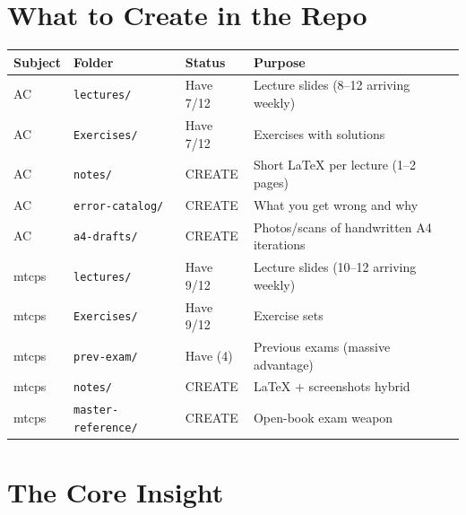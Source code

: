 \documentclass[11pt,a4paper]{article}
\begin{document}
\section{What to Create in the Repo}

\begin{center}
\renewcommand{\arraystretch}{1.3}
\begin{tabular}{llll}
\toprule
\textbf{Subject} & \textbf{Folder} & \textbf{Status} & \textbf{Purpose} \\
\midrule
AC & \texttt{lectures/} & Have 7/12 & Lecture slides (8--12 arriving weekly) \\
AC & \texttt{Exercises/} & Have 7/12 & Exercises with solutions \\
AC & \texttt{notes/} & \textcolor{warnred}{CREATE} & Short LaTeX per lecture (1--2 pages) \\
AC & \texttt{error-catalog/} & \textcolor{warnred}{CREATE} & What you get wrong and why \\
AC & \texttt{a4-drafts/} & \textcolor{warnred}{CREATE} & Photos/scans of handwritten A4 iterations \\
\midrule
mtcps & \texttt{lectures/} & Have 9/12 & Lecture slides (10--12 arriving weekly) \\
mtcps & \texttt{Exercises/} & Have 9/12 & Exercise sets \\
mtcps & \texttt{prev-exam/} & Have (4) & Previous exams (massive advantage) \\
mtcps & \texttt{notes/} & \textcolor{warnred}{CREATE} & LaTeX + screenshots hybrid \\
mtcps & \texttt{master-reference/} & \textcolor{warnred}{CREATE} & Open-book exam weapon \\
\bottomrule
\end{tabular}
\end{center}

\section{The Core Insight}
\end{document}
